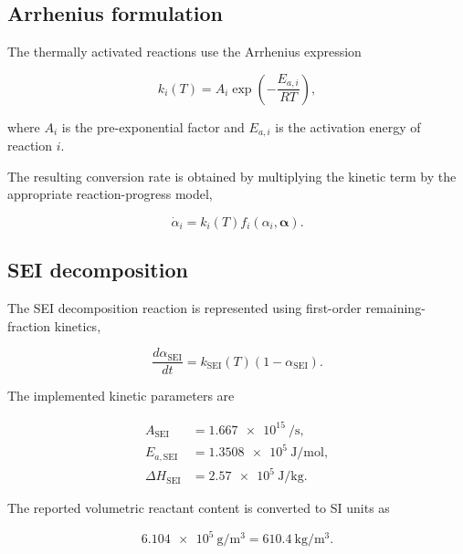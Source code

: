 \subsection{Arrhenius formulation}

The thermally activated reactions use the Arrhenius expression

\begin{equation}
    k_i(T)
    =
    A_i
    \exp
    \left(
        -\frac{E_{a,i}}{RT}
    \right),
    \label{eq:hu_arrhenius}
\end{equation}

where $A_i$ is the pre-exponential factor and $E_{a,i}$ is the
activation energy of reaction $i$.

The resulting conversion rate is obtained by multiplying the kinetic
term by the appropriate reaction-progress model,

\begin{equation}
    \dot{\alpha}_i
    =
    k_i(T)
    f_i
    \left(
        \alpha_i,
        \boldsymbol{\alpha}
    \right).
    \label{eq:hu_generic_progress}
\end{equation}


\subsection{SEI decomposition}

The SEI decomposition reaction is represented using first-order
remaining-fraction kinetics,

\begin{equation}
    \frac{d\alpha_{\mathrm{SEI}}}{dt}
    =
    k_{\mathrm{SEI}}(T)
    \left(
        1-\alpha_{\mathrm{SEI}}
    \right).
    \label{eq:hu_sei_progress}
\end{equation}

The implemented kinetic parameters are

\begin{align}
    A_{\mathrm{SEI}}
    &=
    \num{1.667e15}
    \ \si{\per\second},
    \\
    E_{a,\mathrm{SEI}}
    &=
    \num{1.3508e5}
    \ \si{\joule\per\mole},
    \\
    \Delta H_{\mathrm{SEI}}
    &=
    \num{2.57e5}
    \ \si{\joule\per\kilogram}.
\end{align}

The reported volumetric reactant content is converted to SI units as

\begin{equation}
    \num{6.104e5}
    \ \si{\gram\per\meter\cubed}
    =
    \num{610.4}
    \ \si{\kilogram\per\meter\cubed}.
\end{equation}

